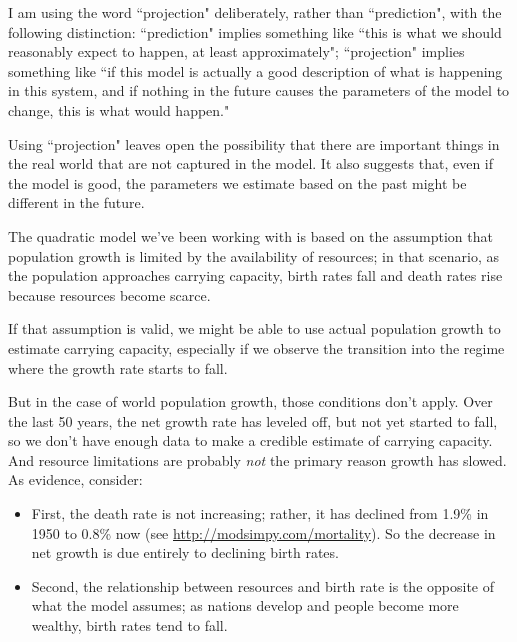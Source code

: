 \documentclass[12pt]{book}
\theoremstyle{exercise}
\begin{document}
I am using the word ``projection" deliberately, rather than ``prediction", with the following distinction: ``prediction" implies something like ``this is what we should reasonably expect to happen, at least approximately"; ``projection" implies something like ``if this model is actually a good description of what is happening in this system, and if nothing in the future causes the parameters of the model to change, this is what would happen."

Using ``projection" leaves open the possibility that there are important things in the real world that are not captured in the model.  It also suggests that, even if the model is good, the parameters we estimate based on the past might be different in the future.

The quadratic model we've been working with is based on the assumption that population growth is limited by the availability of resources; in that scenario, as the population approaches carrying capacity, birth rates fall and death rates rise because resources become scarce.


If that assumption is valid, we might be able to use actual population growth to estimate carrying capacity, especially if we observe the transition into the regime where the growth rate starts to fall.

But in the case of world population growth, those conditions don't apply.  Over the last 50 years, the net growth rate has leveled off, but not yet started to fall, so we don't have enough data to make a credible estimate of carrying capacity.  And resource limitations are probably {\em not} the primary reason growth has slowed.  As evidence, consider:

\begin{itemize}

\item First, the death rate is not increasing; rather, it has declined from 1.9\% in 1950 to 0.8\% now (see \url{http://modsimpy.com/mortality}).  So the decrease in net growth is due entirely to declining birth rates.


\item Second, the relationship between resources and birth rate is the opposite of what the model assumes; as nations develop and people become more wealthy, birth rates tend to fall.  


\end{itemize} 
\end{document}
